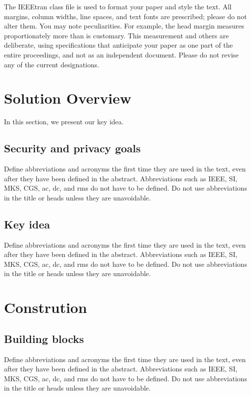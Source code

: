 \documentclass[conference]{IEEEtran}
\begin{document}
The IEEEtran class file is used to format your paper and style the text. All margins, 
column widths, line spaces, and text fonts are prescribed; please do not 
alter them. You may note peculiarities. For example, the head margin
measures proportionately more than is customary. This measurement 
and others are deliberate, using specifications that anticipate your paper 
as one part of the entire proceedings, and not as an independent document. 
Please do not revise any of the current designations.

\section{Solution Overview}
In this section, we present our key idea.

\subsection{Security and privacy goals}

Define abbreviations and acronyms the first time they are used in the text, 
even after they have been defined in the abstract. Abbreviations such as 
IEEE, SI, MKS, CGS, ac, dc, and rms do not have to be defined. Do not use 
abbreviations in the title or heads unless they are unavoidable.

\subsection{Key idea}

Define abbreviations and acronyms the first time they are used in the text, 
even after they have been defined in the abstract. Abbreviations such as 
IEEE, SI, MKS, CGS, ac, dc, and rms do not have to be defined. Do not use 
abbreviations in the title or heads unless they are unavoidable.

\section{Constrution}

\subsection{Building blocks}

Define abbreviations and acronyms the first time they are used in the text, 
even after they have been defined in the abstract. Abbreviations such as 
IEEE, SI, MKS, CGS, ac, dc, and rms do not have to be defined. Do not use 
abbreviations in the title or heads unless they are unavoidable.
\end{document}
